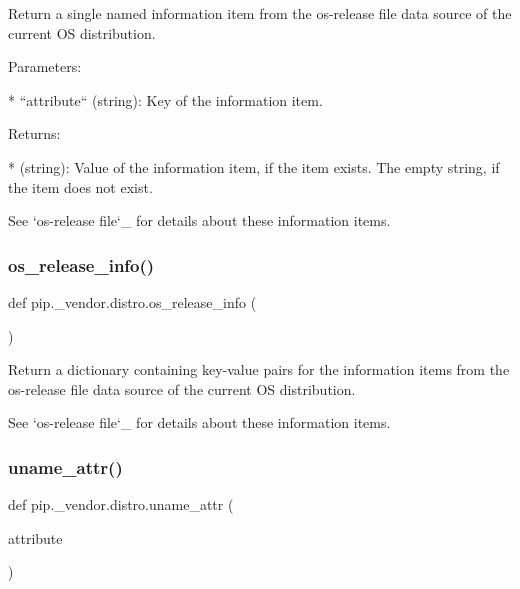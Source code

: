 \begin{DoxyVerb}Return a single named information item from the os-release file data source
of the current OS distribution.

Parameters:

* ``attribute`` (string): Key of the information item.

Returns:

* (string): Value of the information item, if the item exists.
  The empty string, if the item does not exist.

See `os-release file`_ for details about these information items.
\end{DoxyVerb}
 \mbox{\label{namespacepip_1_1__vendor_1_1distro_a4ccfe219ce2e3c7ba2c406db30180d06}} 
\subsubsection{\texorpdfstring{os\+\_\+release\+\_\+info()}{os\_release\_info()}}
{\footnotesize\ttfamily def pip.\+\_\+vendor.\+distro.\+os\+\_\+release\+\_\+info (\begin{DoxyParamCaption}{ }\end{DoxyParamCaption})}

\begin{DoxyVerb}Return a dictionary containing key-value pairs for the information items
from the os-release file data source of the current OS distribution.

See `os-release file`_ for details about these information items.
\end{DoxyVerb}
 \mbox{\label{namespacepip_1_1__vendor_1_1distro_a874440f4f03009ecdc66f97975e81a33}} 
\subsubsection{\texorpdfstring{uname\+\_\+attr()}{uname\_attr()}}
{\footnotesize\ttfamily def pip.\+\_\+vendor.\+distro.\+uname\+\_\+attr (\begin{DoxyParamCaption}\item[{}]{attribute }\end{DoxyParamCaption})}

